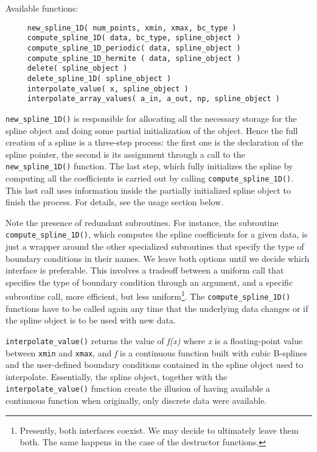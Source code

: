 \documentclass[]{report}   %
\begin{document}
Available functions:
\begin{verbatim}
     new_spline_1D( num_points, xmin, xmax, bc_type )
     compute_spline_1D( data, bc_type, spline_object )
     compute_spline_1D_periodic( data, spline_object )
     compute_spline_1D_hermite ( data, spline_object )
     delete( spline_object )
     delete_spline_1D( spline_object )
     interpolate_value( x, spline_object )
     interpolate_array_values( a_in, a_out, np, spline_object )
\end{verbatim}
\verb+new_spline_1D()+ is responsible for allocating all the necessary storage for the spline object and doing some partial initialization of the object. Hence the full creation of a spline is a three-step process: the first one is the declaration of the spline pointer, the second is its assignment through a call to the \verb+new_spline_1D()+ function. The last step, which fully initializes the spline by computing all the coefficients is carried out by calling \verb+compute_spline_1D()+. This last call uses information inside the partially initialized spline object to finish the process. For details, see the usage section below. 

Note the presence of redundant subroutines. For instance, the subroutine \verb+compute_spline_1D()+, which computes the spline coefficients for a given data, is just a wrapper around the other specialized subroutines that specify the type of boundary conditions in their names. We leave both options until we decide which interface is preferable. This involves a tradeoff between a uniform call that specifies the type of boundary condition through an argument, and a specific subroutine call, more efficient, but less uniform\footnote{Presently, both interfaces coexist. We may decide to ultimately leave them both. The same happens in the case of the destructor functions.}. The \verb+compute_spline_1D()+ functions have to be called again any time that the underlying data changes or if the spline object is to be used with new data. 

\verb+interpolate_value()+ returns the value of \emph{f(x)} where \emph{x} is a floating-point value between \verb+xmin+ and \verb+xmax+, and \emph{f} is a continuous function built with cubic B-splines and the user-defined boundary conditions contained in the spline object used to interpolate. Essentially, the spline object, together with the \verb+interpolate_value()+ function create the illusion of having available a continuous function when originally, only discrete data were available.
\end{document}
